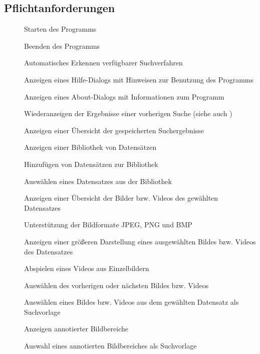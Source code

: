 \subsection{Pflichtanforderungen}
\begin{description}
	\item[] Starten des Programms
	\item[] Beenden des Programms
	\item[] Automatisches Erkennen verfügbarer Suchverfahren
	\item[] Anzeigen eines Hilfe-Dialogs mit Hinweisen zur Benutzung des Programms
	\item[] Anzeigen eines About-Dialogs mit Informationen zum Programm
	\newline
	\item[] Wiederanzeigen der Ergebnisse einer vorherigen Suche (siehe auch )
	\item[] Anzeigen einer Übersicht der gespeicherten Suchergebnisse
	\item[] Anzeigen einer Bibliothek von Datensätzen
	\item[] Hinzufügen von Datensätzen zur Bibliothek
	\item[] Ausw\"ahlen eines Datensatzes aus der Bibliothek
	\item[] Anzeigen einer Übersicht der Bilder bzw. Videos des gewählten Datensatzes
	\item[] Unterstützung der Bildformate JPEG, PNG und BMP
	\item[] Anzeigen einer größeren Darstellung eines ausgewählten Bildes bzw. Videos des Datensatzes
	\item[] Abspielen eines Videos aus Einzelbildern
	\item[] Auswählen des vorherigen oder nächsten Bildes bzw. Videos %
	\item[] Ausw\"ahlen eines Bildes bzw. Videos aus dem gewählten Datensatz als Suchvorlage
	\item[] Anzeigen annotierter Bildbereiche
	\item[] Auswahl eines annotierten Bildbereiches als Suchvorlage

\end{description}
